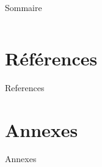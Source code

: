 \documentclass[handout,8pt]{beamer} %
\begin{document}
\begin{frame}{Sommaire}
	\begin{tiny}
	\begin{columns}[t]
		\begin{column}{0.3\textwidth}
			\tableofcontents[sections=1]
		\end{column}
		\begin{column}{0.3\textwidth}
			\tableofcontents[sections=2]
		\end{column}
		\begin{column}{0.3\textwidth}
			\tableofcontents[sections=3]
		\end{column}
	\end{columns}
	\end{tiny}
\end{frame}


\section*{Références}
\begin{frame}[allowframebreaks]{References} 
	\nocite{*}
	 
	
\end{frame}


\section*{Annexes}
\begin{frame}{Annexes}


\end{frame}
\end{document}
